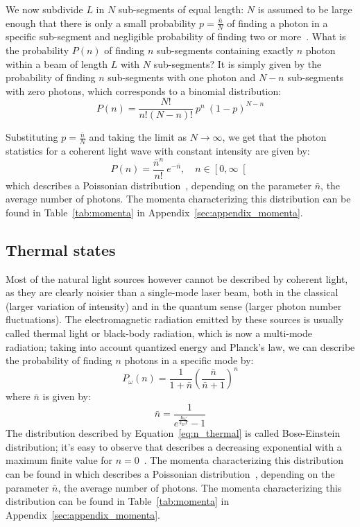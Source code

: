 \documentclass[prl,twocolumn]{revtex4-1}
\begin{document}
We now subdivide $L$ in $N$ sub-segments of equal length: $N$ is assumed to be large enough that there is only a small probability $p = \frac{\bar{n}}{N}$ of finding a photon in a specific sub-segment and negligible probability of finding two or more~\cite{pap1}. What is the probability $P(n)$ of finding $n$ sub-segments containing exactly $n$ photon within a beam of length $L$ with $N$ sub-segments? It is simply given by the probability of finding $n$ sub-segments with one photon and $N-n$ sub-segments with zero photons, which corresponds to a binomial distribution:
%
\begin{equation}
    P(n) = \frac{N!}{n!(N-n)!} \: p^n \: (1-p)^{N-n}
\end{equation}

Substituting $p = \frac{\bar{n}}{N}$ and taking the limit as $N \rightarrow \infty$, we get that the photon statistics for a coherent light wave with constant intensity are given by:
%
\begin{equation}
    P(n) = \frac{\bar{n}^n}{n!} \: e^{-\bar{n}}, \quad n \in \left[0, \infty\right[
    \label{eq:n_coherent}
\end{equation}
%
which describes a Poissonian distribution~\cite{pap1}, depending on the parameter $\bar{n}$, the average number of photons. The momenta characterizing this distribution can be found in Table~\ref{tab:momenta} in Appendix~\ref{sec:appendix_momenta}.

\subsection{Thermal states}
Most of the natural light sources however cannot be described by coherent light, as they are clearly noisier than a single-mode laser beam, both in the classical (larger variation of intensity) and in the quantum sense (larger photon number fluctuations). The electromagnetic radiation emitted by these sources is usually called thermal light or black-body radiation, which is now a multi-mode radiation; taking into account quantized energy and Planck's law, we can describe the probability of finding $n$ photons in a specific mode by:
%
\begin{equation}
    P_\omega(n) = \frac{1}{1 + \bar{n}} \left( \frac{\bar{n}}{\bar{n} + 1}\right)^n
    \label{eq:n_thermal}
\end{equation}
%
where $\bar{n}$ is given by:
%
\begin{equation}
    \bar{n} = \frac{1}{e^{\frac{\hbar\omega}{k_BT}}-1}
\end{equation}
%
The distribution described by Equation~\eqref{eq:n_thermal} is called Bose-Einstein distribution; it's easy to observe that describes a decreasing exponential with a maximum finite value for $n=0$~\cite{pap1}. The momenta characterizing this distribution can be found in which describes a Poissonian distribution~\cite{pap1}, depending on the parameter $\bar{n}$, the average number of photons. The momenta characterizing this distribution can be found in Table~\ref{tab:momenta} in Appendix~\ref{sec:appendix_momenta}.
\end{document}
